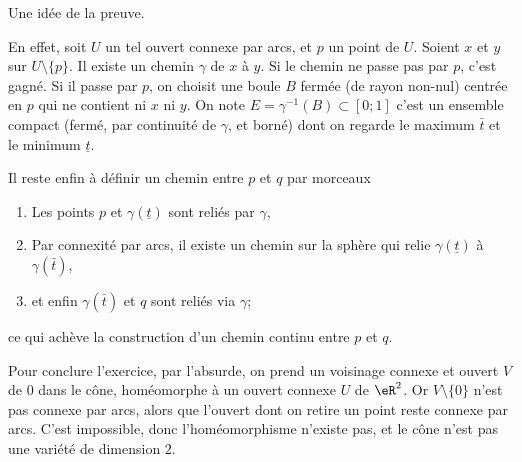 \begin{normaltext}
	Une idée de la preuve.

	En effet, soit \( U\) un tel ouvert connexe par arcs, et \( p\) un point
	de \( U\). Soient \( x\) et \( y\) sur \( U\setminus\{p\}\). Il existe un
	chemin \( \gamma\) de \( x\) à \( y\). Si le chemin ne passe pas par \( p\),
	c'est gagné. Si il passe par \( p\), on choisit une boule \( B\) fermée
	(de rayon non-nul) centrée en \( p\) qui ne contient ni \( x\) ni
	\( y\). On note
	\( E = \gamma^{-1}(B) \subset [0;1]\) c'est un ensemble compact
	(fermé, par continuité de \( \gamma\), et borné) dont on regarde le
	maximum \( \bar t\) et le minimum \( \underline t\).

	Il reste enfin à définir un chemin entre \( p\) et \( q\) par morceaux
	\begin{enumerate}
		\item Les points \( p\) et \( \gamma(\underline t)\) sont reliés par
		      \( \gamma\),
		\item Par connexité par arcs, il existe un chemin sur la sphère qui
		      relie \( \gamma(\underline t)\) à \( \gamma(\bar t)\),
		\item et enfin \( \gamma(\bar t)\) et \( q\) sont reliés via \( \gamma\);
	\end{enumerate}
	ce qui achève la construction d'un chemin continu entre \( p\) et \( q\).
\end{normaltext}

Pour conclure l'exercice, par l'absurde, on prend un voisinage
connexe et ouvert \( V\) de \( 0\) dans le cône, homéomorphe à un ouvert
connexe \( U\) de \( \eR^2\). Or \( V\setminus\{0\}\) n'est pas connexe par
arcs, alors que l'ouvert dont on retire un point reste connexe par
arcs. C'est impossible, donc l'homéomorphisme n'existe pas, et le
cône n'est pas une variété de dimension \( 2\).
